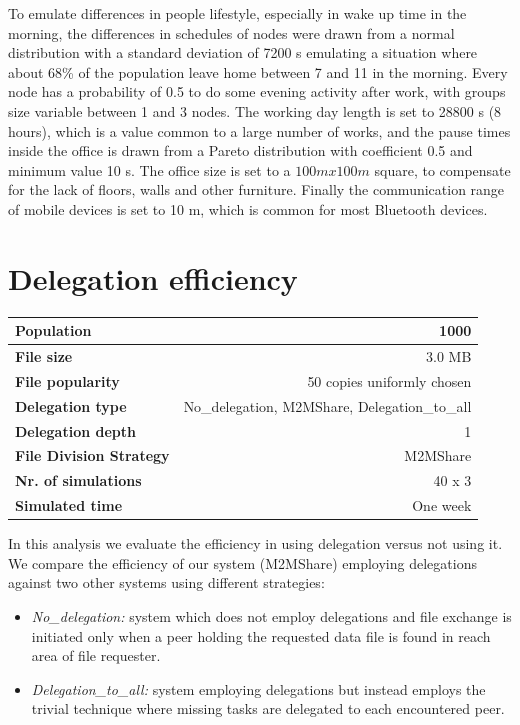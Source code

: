 To emulate differences in people lifestyle, especially in wake up time in the morning, the differences in schedules of nodes were drawn from a normal distribution with a standard deviation of 7200 s emulating a situation where about 68\% of the population leave home between 7 and 11 in the morning. Every node has a probability of 0.5 to do some evening activity after work, with groups size variable between 1 and 3 nodes. The working day length is set to 28800 s (8 hours), which is a value common to a large number of works, and the pause times inside the office is drawn from a Pareto distribution with coefficient 0.5 and minimum value 10 s. The office size is set to a $100 m x 100 m$ square, to compensate for the lack of floors, walls and other furniture. Finally the communication range of mobile devices is set to 10 m, which is common for most Bluetooth devices.
\\


\newpage
\section{Delegation efficiency}
\label{analisiDelegationEfficiency}
\begin{table}[h]
\begin{center}
\begin{tabular}{|l|r|}
\hline
\bfseries Population & 1000 \\
\hline
\bfseries File size & 3.0 MB \\
\hline
\bfseries File popularity & 50 copies uniformly chosen \\
\hline
\bfseries Delegation type & No\_delegation, M2MShare, Delegation\_to\_all \\
\hline
\bfseries Delegation depth & 1 \\
\hline
\bfseries File Division Strategy & M2MShare \\
\hline
\bfseries Nr. of simulations & 40 x 3\\
\hline
\bfseries Simulated time & One week \\
\hline
\end{tabular}
\end{center}
\end{table}
In this analysis we evaluate the efficiency in using delegation versus not using it.
We compare the efficiency of our system (M2MShare) employing delegations against two other systems using different strategies:
\begin{itemize}
\item \textit{No\_delegation:} system which does not employ delegations and file exchange is initiated only when a peer holding the requested data file is found in reach area of file requester.
\item \textit{Delegation\_to\_all:} system employing delegations but instead employs the trivial technique where missing tasks are delegated to each encountered peer.
\end{itemize}

